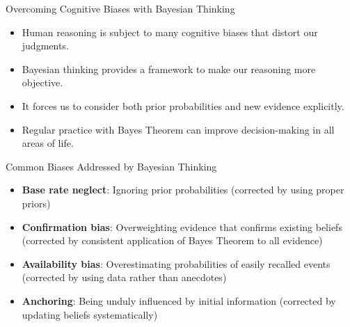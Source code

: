 \documentclass{beamer}
\begin{document}
	\begin{frame}{Overcoming Cognitive Biases with Bayesian Thinking}
		\begin{itemize}
			\item Human reasoning is subject to many cognitive biases that distort our judgments.
			\item Bayesian thinking provides a framework to make our reasoning more objective.
			\item It forces us to consider both prior probabilities and new evidence explicitly.
			\item Regular practice with Bayes Theorem can improve decision-making in all areas of life.
		\end{itemize}
		
		\begin{block}{Common Biases Addressed by Bayesian Thinking}
			\scriptsize
			\begin{itemize}
				\item \textbf{Base rate neglect}: Ignoring prior probabilities (corrected by using proper priors)
				\item \textbf{Confirmation bias}: Overweighting evidence that confirms existing beliefs (corrected by consistent application of Bayes Theorem to all evidence)
				\item \textbf{Availability bias}: Overestimating probabilities of easily recalled events (corrected by using data rather than anecdotes)
				\item \textbf{Anchoring}: Being unduly influenced by initial information (corrected by updating beliefs systematically)
			\end{itemize}
		\end{block}
	\end{frame}
	
\end{document}
